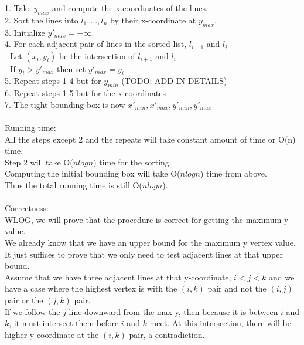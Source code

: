 \documentclass[11pt,psfig]{article}
\begin{document}
1. Take $y_{max}$ and compute the x-coordinates of the lines. \\
2. Sort the lines into $l_1,...,l_n$ by their x-coordinate at $y_{max}$. \\
3. Initialize $y'_{max} = -\infty$. \\
4. For each adjacent pair of lines in the sorted list, $l_{i+1}$ and $l_i$\\
- Let $(x_i,y_i)$ be the intersection of $l_{i+1}$ and $l_i$\\
- If $y_i > y'_{max}$ then set $y'_{max} = y_i$\\
5. Repeat steps 1-4 but for $y_{min}$ (TODO: ADD IN DETAILS)\\
6. Repeat steps 1-5 but for the x coordinates\\
7. The tight bounding box is now $x'_{min}, x'_{max}, y'_{min}, y'_{max}$\\
\\
Running time:\\
All the steps except 2 and the repeats will take constant amount of time or O(n) time. \\
Step 2 will take O($n log n$) time for the sorting. \\
Computing the initial bounding box will take O($n log n$) time from above. \\
Thus the total running time is still O($n log n$). \\
\\
Correctness:
\\
WLOG, we will prove that the procedure is correct for getting the maximum y-value. \\
We already know that we have an upper bound for the maximum y vertex value. \\
It just suffices to prove that we only need to test adjacent lines at that upper bound. \\
Assume that we have three adjacent lines at that y-coordinate, $i < j < k$ and we have a case where the highest vertex is with the $(i,k)$ pair and not the $(i,j)$ pair or the $(j,k)$ pair. \\
If we follow the $j$ line downward from the max y, then because it is between $i$ and $k$, it must intersect them before $i$ and $k$ meet. At this intersection, there will be higher y-coordinate at the $(i,k)$ pair, a contradiction. 
\end{document}
